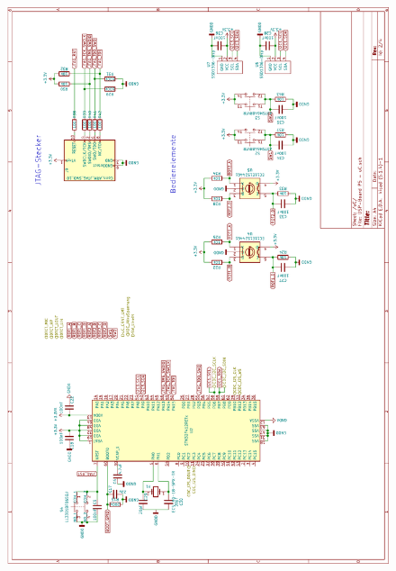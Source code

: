 \begin{appendix}
\begin{figure}[h]
	\centering
	\includegraphics[width=0.95\linewidth]{appendix/DSP-Board Schema V1-1 (2).pdf}
\end{figure}


\end{appendix}
